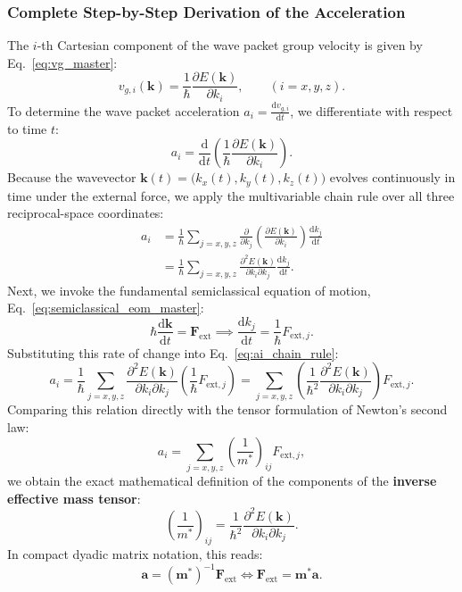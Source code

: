 \documentclass[11pt,a4paper]{article}
\newcommand{\dv}[2]{\frac{\mathrm{d}#1}{\mathrm{d}#2}}
\newcommand{\vb}[1]{\mathbf{#1}}
\newcommand{\hb}{\hbar}
\newcommand{\hbarsq}{\hb^2}
\newcommand{\kk}{\mathbf{k}}
\begin{document}
\subsubsection{Complete Step-by-Step Derivation of the Acceleration}
The $i$-th Cartesian component of the wave packet group velocity is given by Eq.~\eqref{eq:vg_master}:
\begin{equation}
    v_{g,i}(\kk) = \frac{1}{\hb}\frac{\partial E(\kk)}{\partial k_i}, \qquad (i = x, y, z).
\end{equation}
To determine the wave packet acceleration $a_i = \dv{v_{g,i}}{t}$, we differentiate with respect to time $t$:
\begin{equation}
    a_i = \dv{}{t}\left(\frac{1}{\hb}\frac{\partial E(\kk)}{\partial k_i}\right).
\end{equation}
Because the wavevector $\kk(t) = \big(k_x(t), k_y(t), k_z(t)\big)$ evolves continuously in time under the external force, we apply the multivariable chain rule over all three reciprocal-space coordinates:
\begin{align}
    a_i &= \frac{1}{\hb} \sum_{j=x,y,z} \frac{\partial}{\partial k_j}\left(\frac{\partial E(\kk)}{\partial k_i}\right) \dv{k_j}{t} \nonumber \\
        &= \frac{1}{\hb} \sum_{j=x,y,z} \frac{\partial^2 E(\kk)}{\partial k_i \partial k_j} \dv{k_j}{t}.
        \label{eq:ai_chain_rule}
\end{align}
Next, we invoke the fundamental semiclassical equation of motion, Eq.~\eqref{eq:semiclassical_eom_master}:
\begin{equation}
    \hb\dv{\kk}{t} = \vb{F}_{\mathrm{ext}} \implies \dv{k_j}{t} = \frac{1}{\hb} F_{\mathrm{ext},j}.
\end{equation}
Substituting this rate of change into Eq.~\eqref{eq:ai_chain_rule}:
\begin{equation}
    a_i = \frac{1}{\hb} \sum_{j=x,y,z} \frac{\partial^2 E(\kk)}{\partial k_i \partial k_j} \left(\frac{1}{\hb} F_{\mathrm{ext},j}\right) = \sum_{j=x,y,z} \left(\frac{1}{\hbarsq}\frac{\partial^2 E(\kk)}{\partial k_i \partial k_j}\right) F_{\mathrm{ext},j}.
\end{equation}
Comparing this relation directly with the tensor formulation of Newton's second law:
\begin{equation}
    a_i = \sum_{j=x,y,z} \left(\frac{1}{m^*}\right)_{ij} F_{\mathrm{ext},j},
\end{equation}
we obtain the exact mathematical definition of the components of the \textbf{inverse effective mass tensor}:
\begin{equation}
    \boxed{\left(\frac{1}{m^*}\right)_{ij} = \frac{1}{\hbarsq}\frac{\partial^2 E(\kk)}{\partial k_i \partial k_j}.}
    \label{eq:mstar_tensor_master}
\end{equation}
In compact dyadic matrix notation, this reads:
\begin{equation}
    \vb{a} = (\vb{m}^*)^{-1}\vb{F}_{\mathrm{ext}} \iff \vb{F}_{\mathrm{ext}} = \vb{m}^*\vb{a}.
\end{equation}
\end{document}
